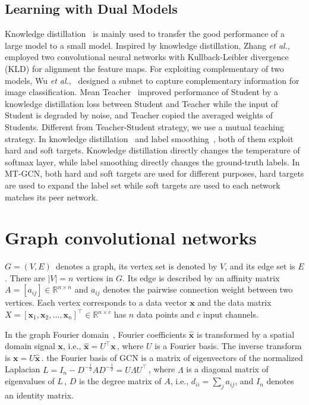 \documentclass{article}
\newcommand{\x}{{\bm x}}
\newcommand{\T}{{\top}}
\begin{document}
\subsection{Learning with Dual Models}
Knowledge distillation~\cite{hinton2015distilling} is mainly used to transfer the good performance of a large model to a small model. Inspired by knowledge distillation, Zhang {\it et al.},~\cite{zhang2018deep} employed two convolutional neural networks with Kullback-Leibler divergence (KLD) for alignment the feature maps. For exploiting complementary of two models, Wu {\it et al.},~\cite{wu2019mutual} designed a subnet to capture complementary information for image classification. Mean Teacher~\cite{tarvainen2017mean} improved performance of Student by a knowledge distillation loss between Student and Teacher while the input of Student is degraded by noise, and Teacher copied the averaged weights of Students. Different from Teacher-Student strategy, we use a mutual teaching strategy. In knowledge distillation~\cite{hinton2015distilling} and label smoothing~\cite{muller2019does}, both of them exploit hard and soft targets. Knowledge distillation directly changes the temperature of softmax layer, while label smoothing directly changes the ground-truth labels. In MT-GCN, both hard and soft targets are used for different purposes, hard targets are used to expand the label set while soft targets are used to each network matches its peer network.
\section{Graph convolutional networks}\label{Preliminaries}
$G=(V,E)\,$ denotes a graph, its vertex set is denoted by $V$, and its edge set is $E$. There are $|V|=n$ vertices in $G$. Its edge is described by an affinity matrix $A=[a_{ij}]\in \mathbb{R}^{n \times n}$ and $a_{ij}$ denotes the pairwise connection weight between two vertices. Each vertex corresponds to a data vector $\x$ and the data matrix $X=[\x_1,\x_2,\ldots,\x_n]^\T \in\mathbb{R}^{n \times c}$ has $n$ data points and $c$ input channels.

In the graph Fourier domain~\cite{shuman2013emerging}, Fourier coefficients $\hat{\x}$ is transformed by a spatial domain signal $\x$, i.e., $\hat{\x}=U^\T \x\,$, where $U$ is a Fourier basis. The inverse transform is $\x=U \hat{\x}\,$. the Fourier basis of GCN is a matrix of eigenvectors of the normalized Laplacian $L=I_n-D^{-\frac{1}{2}}AD^{-\frac{1}{2}}=U\Lambda U^\T\,$, where $\Lambda$ is a diagonal matrix of eigenvalues of $L\,$, $D$ is the degree matrix of $A$, i.e., $d_{ii}=\sum_ja_{ij}$, and $I_n$ denotes an identity matrix.
\end{document}
